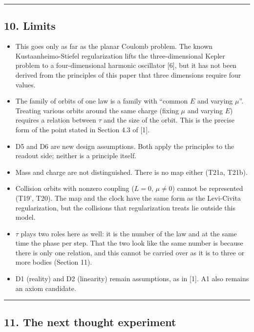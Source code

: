 \documentclass[
  a4paper,
]{article}
\providecommand{\tightlist}{%
  \setlength{\itemsep}{0pt}\setlength{\parskip}{0pt}}
\begin{document}
\begin{center}\rule{0.5\linewidth}{0.5pt}\end{center}

\subsection{10. Limits}\label{limits}

\begin{itemize}
\tightlist
\item
  This goes only as far as the planar Coulomb problem. The known
  Kustaanheimo-Stiefel regularization lifts the three-dimensional Kepler
  problem to a four-dimensional harmonic oscillator {[}6{]}, but it has
  not been derived from the principles of this paper that three
  dimensions require four values.
\item
  The family of orbits of one law is a family with ``common \(E\) and
  varying \(\mu\)''. Treating various orbits around the same charge
  (fixing \(\mu\) and varying \(E\)) requires a relation between
  \(\tau\) and the size of the orbit. This is the precise form of the
  point stated in Section 4.3 of {[}1{]}.
\item
  D5 and D6 are new design assumptions. Both apply the principles to the
  readout side; neither is a principle itself.
\item
  Mass and charge are not distinguished. There is no map either (T21a,
  T21b).
\item
  Collision orbits with nonzero coupling (\(L=0\), \(\mu\neq0\)) cannot
  be represented (T19', T20). The map and the clock have the same form
  as the Levi-Civita regularization, but the collisions that
  regularization treats lie outside this model.
\item
  \(\tau\) plays two roles here as well: it is the number of the law and
  at the same time the phase per step. That the two look like the same
  number is because there is only one relation, and this cannot be
  carried over as it is to three or more bodies (Section 11).
\item
  D1 (reality) and D2 (linearity) remain assumptions, as in {[}1{]}. A1
  also remains an axiom candidate.
\end{itemize}

\begin{center}\rule{0.5\linewidth}{0.5pt}\end{center}

\subsection{11. The next thought
experiment}\label{the-next-thought-experiment}
\end{document}
